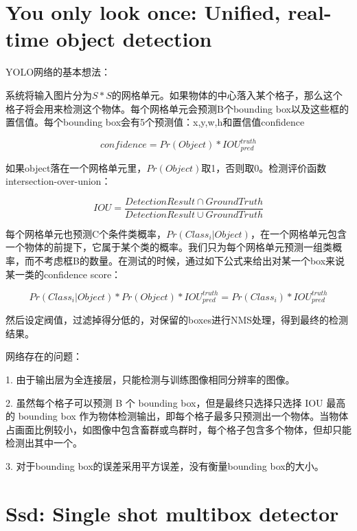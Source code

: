 \documentclass[12pt,onecolumn]{article}
\begin{document}
    \section{You only look once: Unified, real-time object detection\cite{redmon2016you}}

    YOLO网络的基本想法：

    系统将输入图片分为$S\ast S$的网格单元。如果物体的中心落入某个格子，那么这个格子将会用来检测这个物体。每个网格单元会预测B个bounding box以及这些框的置信值。每个bounding box会有5个预测值：x,y,w,h和置信值confidence

    \begin{equation}
        confidence=Pr(Object)\ast IOU^{truth}_{pred}
    \end{equation}

    如果object落在一个网格单元里，$Pr(Object)$取1，否则取0。检测评价函数 intersection-over-union：

    \begin{equation}
        IOU=\frac{DetectionResult\cap GroundTruth}{DetectionResult\cup GroundTruth}
    \end{equation}

    每个网格单元也预测C个条件类概率，$Pr(Class_i|Object)$，在一个网格单元包含一个物体的前提下，它属于某个类的概率。我们只为每个网格单元预测一组类概率，而不考虑框B的数量。在测试的时候，通过如下公式来给出对某一个box来说某一类的confidence score： 
    
    \begin{equation}
        Pr(Class_i|Object)\ast Pr(Object)\ast IOU^{truth}_{pred}=Pr(Class_i)\ast IOU^{truth}_{pred}
    \end{equation}

    然后设定阀值，过滤掉得分低的，对保留的boxes进行NMS处理，得到最终的检测结果。

    网络存在的问题：

    1. 由于输出层为全连接层，只能检测与训练图像相同分辨率的图像。

    2. 虽然每个格子可以预测 B 个 bounding box，但是最终只选择只选择 IOU 最高的 bounding box 作为物体检测输出，即每个格子最多只预测出一个物体。当物体占画面比例较小，如图像中包含畜群或鸟群时，每个格子包含多个物体，但却只能检测出其中一个。

    3. 对于bounding box的误差采用平方误差，没有衡量bounding box的大小。
    
    \section{Ssd: Single shot multibox detector\cite{liu2016ssd}}
\end{document}
